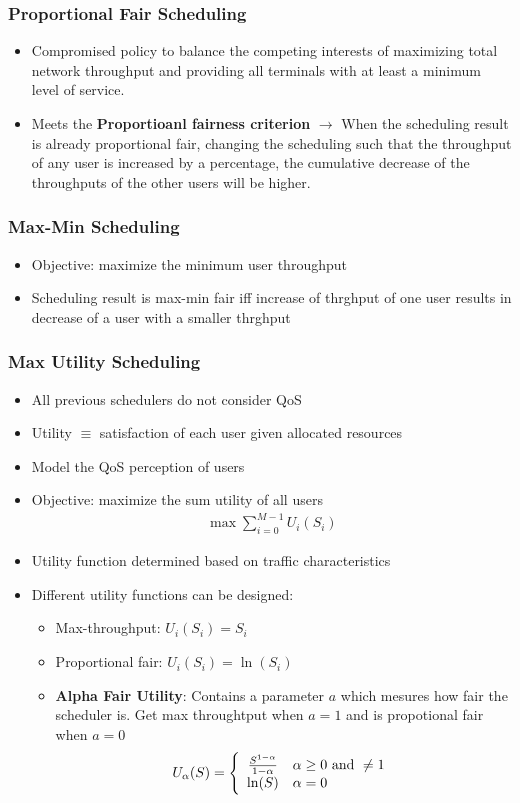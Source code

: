 \subsubsection{Proportional Fair Scheduling}
\begin{itemize}
	\item Compromised policy to balance the competing interests of maximizing total network throughput and providing all terminals with at least a minimum level of service.
	\item Meets the \textbf{Proportioanl fairness criterion} $\rightarrow$ When the scheduling result is already proportional fair, changing the scheduling such that the throughput of any user is increased by a percentage, the cumulative decrease of the throughputs of the other users will be higher.
\end{itemize}
\subsubsection{Max-Min Scheduling}
\begin{itemize}
	\item Objective: maximize the minimum user throughput
	\item Scheduling result is max-min fair iff increase of thrghput of one user results in decrease of a user with a smaller thrghput
\end{itemize}
\subsubsection{Max Utility Scheduling}
\begin{itemize}
	\item All previous schedulers do not consider QoS
	\item Utility $\equiv$ satisfaction of each user given allocated resources
	\item Model the QoS perception of users
	\item Objective: maximize the sum utility of all users
	\begin{align*}
		\max \sum_{i=0}^{M-1} U_i (S_i)
	\end{align*}
	\item Utility function determined based on traffic characteristics
	\item Different utility functions can be designed:
	\begin{itemize}
		\item Max-throughput: $U_i(S_i) = S_i$
		\item Proportional fair: $U_i(S_i) = \ln(S_i)$
		\item \textbf{Alpha Fair Utility}: Contains a parameter $a$ which mesures how fair the scheduler is. Get max throughtput when $a=1$ and is propotional fair when $a=0$
		\begin{align*}
			U_{\alpha}(S) = 
			\left\{ 
				\begin{array}{c l}
					\frac{S^{1 - \alpha}}{1-\alpha} & \alpha \geq 0 \text{ and } \neq 1 \\
					\ln(S) & \alpha = 0
				\end{array}
			\right.
		\end{align*}
	\end{itemize}
\end{itemize}
